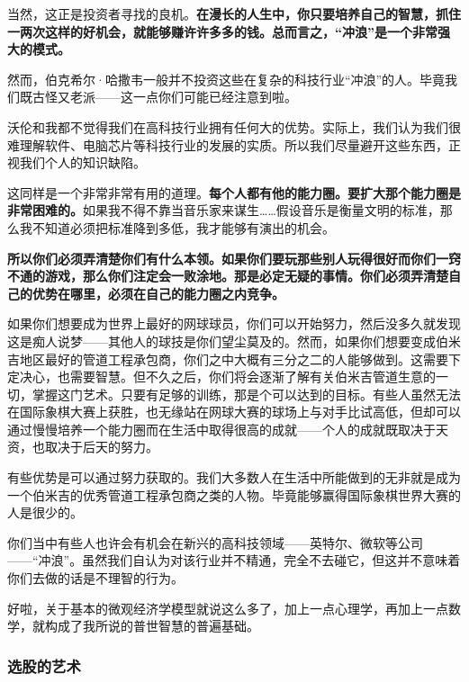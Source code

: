 当然，这正是投资者寻找的良机。\textbf{在漫长的人生中，你只要培养自己的智慧，抓住一两次这样的好机会，就能够赚许许多多的钱。总而言之，“冲浪”是一个非常强大的模式。}
\par

然而，伯克希尔·哈撒韦一般并不投资这些在复杂的科技行业“冲浪”的人。毕竟我们既古怪又老派——这一点你们可能已经注意到啦。
\par

沃伦和我都不觉得我们在高科技行业拥有任何大的优势。实际上，我们认为我们很难理解软件、电脑芯片等科技行业的发展的实质。所以我们尽量避开这些东西，正视我们个人的知识缺陷。
\par

这同样是一个非常非常有用的道理。\textbf{每个人都有他的能力圈。要扩大那个能力圈是非常困难的。}如果我不得不靠当音乐家来谋生……假设音乐是衡量文明的标准，那么我不知道必须把标准降到多低，我才能够有演出的机会。
\par

\textbf{所以你们必须弄清楚你们有什么本领。如果你们要玩那些别人玩得很好而你们一窍不通的游戏，那么你们注定会一败涂地。那是必定无疑的事情。你们必须弄清楚自己的优势在哪里，必须在自己的能力圈之内竞争。}
\par

如果你们想要成为世界上最好的网球球员，你们可以开始努力，然后没多久就发现这是痴人说梦——其他人的球技是你们望尘莫及的。然而，如果你们想要变成伯米吉地区最好的管道工程承包商，你们之中大概有三分之二的人能够做到。这需要下定决心，也需要智慧。但不久之后，你们将会逐渐了解有关伯米吉管道生意的一切，掌握这门艺术。只要有足够的训练，那是个可以达到的目标。有些人虽然无法在国际象棋大赛上获胜，也无缘站在网球大赛的球场上与对手比试高低，但却可以通过慢慢培养一个能力圈而在生活中取得很高的成就——个人的成就既取决于天资，也取决于后天的努力。
\par

有些优势是可以通过努力获取的。我们大多数人在生活中所能做到的无非就是成为一个伯米吉的优秀管道工程承包商之类的人物。毕竟能够赢得国际象棋世界大赛的人是很少的。
\par

你们当中有些人也许会有机会在新兴的高科技领域——英特尔、微软等公司——“冲浪”。虽然我们自认为对该行业并不精通，完全不去碰它，但这并不意味着你们去做的话是不理智的行为。
\par

好啦，关于基本的微观经济学模型就说这么多了，加上一点心理学，再加上一点数学，就构成了我所说的普世智慧的普遍基础。
\par

\subsubsection*{选股的艺术}

